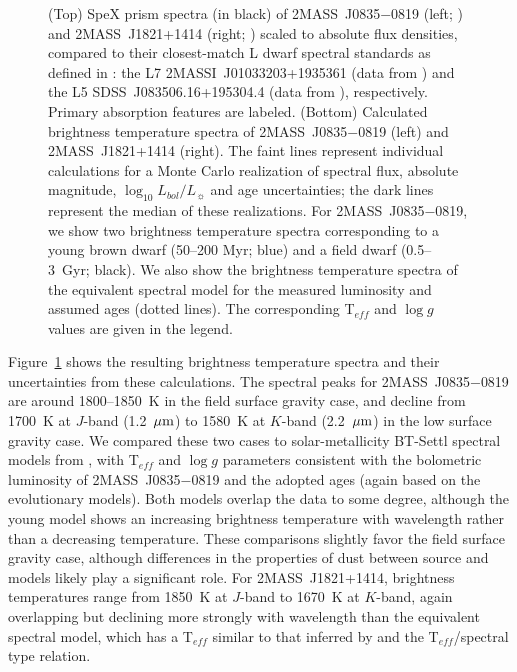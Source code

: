 \documentclass[twocolumn]{aastex6}
\newcommand{\lbol}{$\log_{10}{L_{bol}/L_{\sun}}$}
\newcommand{\teff}{T$_{eff}$}
\newcommand{\logg}{$\log{g}$}
\newcommand{\sha}{2MASS~J0835$-$0819}
\newcommand{\shb}{2MASS~J1821+1414}
\begin{document}
\begin{figure}
\centering
	\caption{(Top) SpeX prism spectra (in black) of {\sha} (left; \citealt{2010ApJ...710.1142B}) and {\shb} (right; \citealt{2008ApJ...686..528L}) scaled to absolute flux densities, compared to their closest-match L dwarf spectral standards as defined in \citet[in magenta]{2010ApJS..190..100K}: the L7 2MASSI~J01033203+1935361 (data from \citealt{2014ApJ...794..143B}) and the L5 SDSS~J083506.16+195304.4 (data from \citealt{2006AJ....131.2722C}), respectively. 
	Primary absorption features are labeled.
	(Bottom) Calculated brightness temperature spectra of {\sha} (left) and {\shb} (right).
	The faint lines represent individual calculations for a Monte Carlo realization of spectral flux, absolute magnitude, {\lbol} and age uncertainties; the dark lines represent the median of these realizations.
	For {\sha}, we show two  brightness temperature spectra corresponding to a young brown dwarf (50--200 Myr; blue) and a field dwarf (0.5--3~Gyr; black).
	We also show the brightness temperature spectra of the equivalent spectral model for the measured luminosity and assumed ages (dotted lines).
	The corresponding {\teff} and {\logg} values are given in the legend.}
	\label{fig:tbright}
	\vspace{0.1in}
\end{figure} 

Figure~\ref{fig:tbright} shows the resulting brightness temperature spectra and their uncertainties from these calculations.  The spectral peaks for {\sha} are around 1800--1850~K in the field surface gravity case, and decline from 1700~K at $J$-band (1.2~$\mbox{$\mu$m}$) to 1580~K at $K$-band (2.2~$\mbox{$\mu$m}$) in the low surface gravity case.
We compared these two cases to solar-metallicity BT-Settl spectral models from \citet{2012RSPTA.370.2765A}, with {\teff} and {\logg} parameters consistent with the bolometric luminosity of {\sha} and the adopted ages (again based on the \citealt{2003A&A...402..701B} evolutionary models). Both models overlap the data to some degree, although the young model shows an increasing brightness temperature with wavelength rather than a decreasing temperature.  These comparisons slightly favor the field surface gravity case, although differences in the properties of dust between source and models likely play a significant role. For {\shb}, 
brightness temperatures range from 1850~K at $J$-band to 1670~K at $K$-band, again overlapping but declining more strongly with wavelength than the equivalent spectral model, which has a {\teff} similar to that inferred by \citet{2016ApJS..225...10F} and the  \citet{2015ApJ...810..158F} {\teff}/spectral type relation.
\end{document}
